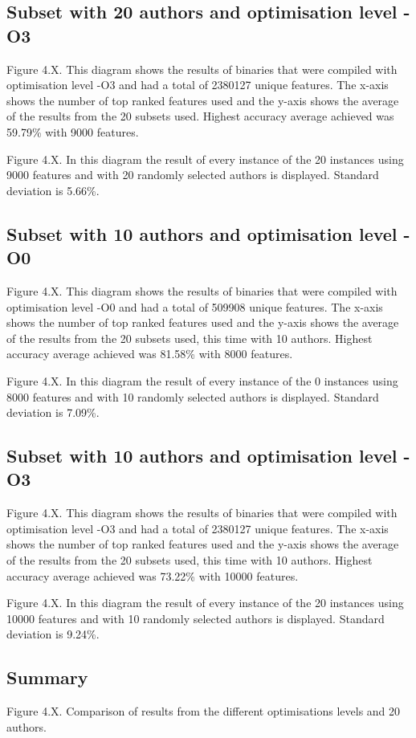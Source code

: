 \documentclass[a4paper,11pt]{kth-mag}
\begin{document}
\subsection{Subset with 20 authors and optimisation level -O3}
Figure 4.X. This diagram shows the results of binaries that were compiled with
optimisation level -O3 and had a total of 2380127 unique features. The x-axis
shows the number of top ranked features used and the y-axis shows the average
of the results from the 20 subsets used. Highest accuracy average achieved was
59.79\% with 9000 features.

Figure 4.X.  In this diagram the result of every instance of the 20 instances
using 9000 features and with 20 randomly selected authors is displayed.
Standard deviation is 5.66\%.

\subsection{Subset with 10 authors and optimisation level -O0}
Figure 4.X.  This diagram shows the results of binaries that were compiled
with optimisation level -O0 and had a total of 509908 unique features. The
x-axis shows the number of top ranked features used and the y-axis shows the
average of the results from the 20 subsets used, this time with 10 authors.
Highest accuracy average achieved was 81.58\% with 8000 features.

Figure 4.X. In this diagram the result of every instance of the 0 instances
using 8000 features and with 10 randomly selected authors is displayed.
Standard deviation is 7.09\%.

\subsection{Subset with 10 authors and optimisation level -O3}
Figure 4.X. This diagram shows the results of binaries that were compiled with
optimisation level -O3 and had a total of 2380127 unique features. The x-axis
shows the number of top ranked features used and the y-axis shows the average
of the results from the 20 subsets used, this time with 10 authors. Highest
accuracy average achieved was 73.22\% with 10000 features.

Figure 4.X. In this diagram the result of every instance of the 20 instances
using 10000 features and with 10 randomly selected authors is displayed.
Standard deviation is 9.24\%.

\subsection{Summary}
Figure 4.X. Comparison of results from the different optimisations levels and
20 authors.
\end{document}
